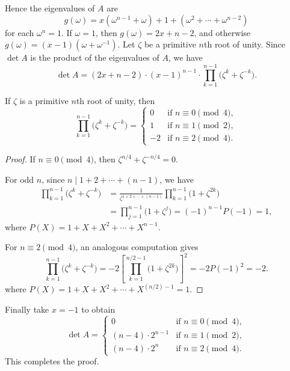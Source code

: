 Hence the eigenvalues of $A$ are \[g(\omega)=x(\omega^{n-1}+\omega)+1+(\omega^2+\cdots+\omega^{n-2})\]
for each $\omega^n=1$. If $\omega=1$, then $g(\omega)=2x+n-2$, and otherwise $g(\omega)=(x-1)(\omega+\omega^{-1})$. Let $\zeta$ be a primitive $n$th root of unity. Since $\det A$ is the product of the eigenvalues of $A$, we have \[\det A=(2x+n-2)\cdot(x-1)^{n-1}\cdot\prod_{k=1}^{n-1}\Big(\zeta^k+\zeta^{-k}\Big).\]
\begin{claim*}
    If $\zeta$ is a primitive $n$th root of unity, then \[\prod_{k=1}^{n-1}\Big(\zeta^k+\zeta^{-k}\Big)=\begin{cases}
            0&\text{if }n\equiv0\pmod4,\\
            1&\text{if }n\equiv1\pmod2,\\
            -2&\text{if }n\equiv2\pmod4.
    \end{cases}\]
\end{claim*}
\begin{proof}
    If $n\equiv0\pmod4$, then $\zeta^{n/4}+\zeta^{-n/4}=0$.

    For odd $n$, since $n\mid 1+2+\cdots+(n-1)$, we have
    \begin{align*}
        \prod_{k=1}^{n-1}\Big(\zeta^k+\zeta^{-k}\Big)&=\frac1{\zeta^{1+2+\cdots+(n-1)}}\prod_{k=1}^{n-1}\Big(1+\zeta^{2k}\Big)\\
        &=\prod_{j=1}^{n-1}\Big(1+\zeta^j\Big)
        =(-1)^{n-1}P(-1)=1,
    \end{align*}
    where $P(X)=1+X+X^2+\cdots+X^{n-1}$.

    For $n\equiv2\pmod4$, an analogous computation gives \[\prod_{k=1}^{n-1}\Big(\zeta^k+\zeta^{-k}\Big)=-2\left[\prod_{k=1}^{n/2-1}\Big(1+\zeta^{2k}\Big)\right]^2=-2P(-1)^2=-2.\]
    where $P(X)=1+X+X^2+\cdots+X^{(n/2)-1}=1$.
\end{proof}

Finally take $x=-1$ to obtain \[\det A=\begin{cases}
        0&\text{if }n\equiv0\pmod4,\\
        (n-4)\cdot2^{n-1}&\text{if }n\equiv1\pmod2,\\
        (n-4)\cdot2^n&\text{if }n\equiv2\pmod4.
\end{cases}\]
This completes the proof.
